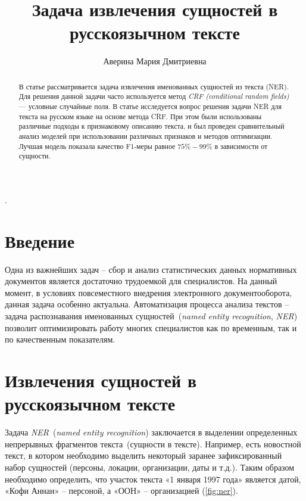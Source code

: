 \documentclass{csmathnotes}
\title{Задача извлечения сущностей в русскоязычном тексте}
\author{Аверина Мария Дмитриевна}
\affiliation{Ярославский государственный университет им. П.\,Г. Демидова}
\begin{document}
\maketitle

\begin{abstract}
В статье рассматривается задача извлечения именованных сущностей из текста (NER).
Для решения данной задачи часто используется метод \emph{CRF (conditional random fields)} --- условные случайные поля.
В статье исследуется вопрос решения задачи NER для текста на русском языке на основе метода CRF.
При этом были использованы различные подходы к признаковому описанию текста, 
и был проведен сравнительный анализ моделей при использовании различных признаков и методов оптимизации.
Лучшая модель показала качество F1-меры равное $75\%-99\%$ в зависимости от сущности.
\end{abstract}

.

\section*{Введение}
Одна из важнейших задач – сбор и анализ статистических данных нормативных
документов является достаточно трудоемкой для специалистов. На данный момент, в условиях повсеместного внедрения электронного документооборота, данная задача особенно актуальна. Автоматизация процесса анализа текстов – задача распознавания именованных сущностей~(\emph{named entity recognition}, \emph{NER})~\cite{base} позволит оптимизировать работу многих специалистов как по временным, так и по качественным показателям.


\section*{Извлечения сущностей в русскоязычном тексте}

Задача \emph{NER}~(\emph{named entity recognition}) заключается в выделении определенных непрерывных фрагментов текста~(сущности в тексте). Например, есть новостной текст, в котором необходимо выделить некоторый заранее зафиксированный набор сущностей (персоны, локации, организации, даты и т.д.). Таким образом необходимо определить, что участок текста «1 января 1997 года» является датой, «Кофи Аннан» – персоной, а «ООН» – организацией (\ref{fig:ner}). 
\end{document}
